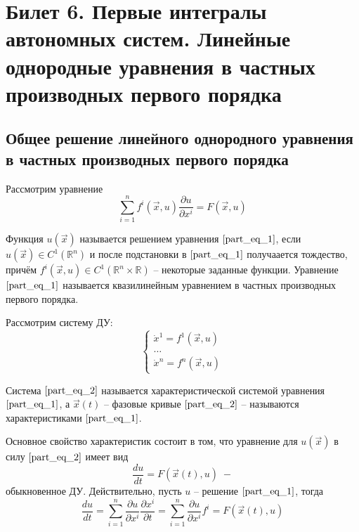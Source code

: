 \documentclass[a4paper, 12pt]{article}
\begin{document}
    \section{Билет 6. Первые интегралы автономных систем. Линейные однородные уравнения в частных производных первого порядка}
    \subsection{Общее решение линейного однородного уравнения в частных производных первого порядка}

    \begin{definition}
        Рассмотрим уравнение 
        \begin{equation}
            \sum \limits_{i = 1}^{n} f^{i} (\overrightarrow{x}, u) \frac{\partial u}{\partial x^{i}} = F(\overrightarrow{x}, u)
            \label{part_eq_1}
        \end{equation}

        Функция $u(\overrightarrow{x})$ называется решением уравнения $\eqref{part_eq_1}$, если $u(\overrightarrow{x}) \in C^{1}(\mathbb{R}^n)$ и после подстановки в $\eqref{part_eq_1}$ получаается тождество, причём $f^{i} (\overrightarrow{x}, u) \in C^{1}(\mathbb{R}^n \times \mathbb{R})$ -- некоторые заданные функции. Уравнение $\eqref{part_eq_1}$ называется квазилинейным уравнением в частных производных первого порядка. 
    \end{definition}
    
    \begin{definition}
        Рассмотрим систему ДУ:
        \begin{equation}
            \begin{cases}
                \dot{x}^1 = f^1(\overrightarrow{x}, u) \\
                \dots                                  \\
                \dot{x}^n = f^n(\overrightarrow{x}, u)
            \end{cases}
            \label{part_eq_2}
        \end{equation}
    
        Система $\eqref{part_eq_2}$ называется характеристической системой уравнения $\eqref{part_eq_1}$, а $\overrightarrow{x}(t)$ -- фазовые кривые $\eqref{part_eq_2}$ -- называются характеристиками $\eqref{part_eq_1}$.
    \end{definition}
   
    Основное свойство характеристик состоит в том, что уравнение для $u(\overrightarrow{x})$ в силу $\eqref{part_eq_2}$ имеет вид 
    \begin{equation*}
        \frac{du}{dt} = F(\overrightarrow{x}(t), u) \; -
    \end{equation*}
    обыкновенное ДУ. Действительно, пусть $u$ -- решение $\eqref{part_eq_1}$, тогда 
    \begin{equation*}
        \frac{du}{dt} =  \sum \limits_{i = 1}^{n} \frac{\partial u}{\partial x^i} \frac{\partial x^i}{\partial t} = \sum \limits_{i = 1}^{n} \frac{\partial u}{\partial x^i} f^i = F(\overrightarrow{x}(t), u)
    \end{equation*}
\end{document}
